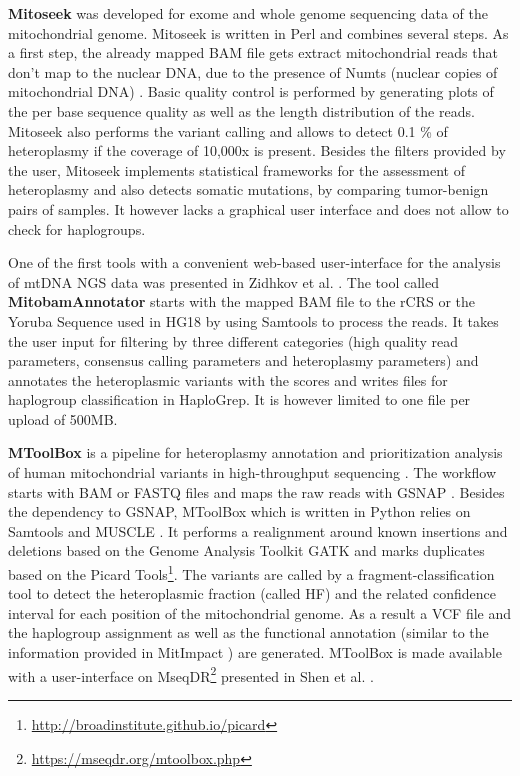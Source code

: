 \textbf{Mitoseek} \cite{Guo2013} was developed for exome and whole genome sequencing data of the mitochondrial genome. Mitoseek is written in Perl and combines several steps. As a first step, the already mapped BAM file gets extract mitochondrial reads that don't map to the nuclear DNA, due to the presence of Numts (nuclear copies of mitochondrial DNA) \cite{Parr2006, Dayama2014}. Basic quality control is performed by generating plots of the per base sequence quality as well as the length distribution of the reads.  Mitoseek also performs the variant calling and allows to detect 0.1 \% of heteroplasmy if the coverage of 10,000x is present. Besides the filters provided by the user, Mitoseek implements statistical frameworks for the assessment of heteroplasmy and also detects somatic mutations, by comparing tumor-benign pairs of samples. It however lacks a graphical user interface and does not allow to check for haplogroups.

One of the first tools with a convenient web-based user-interface for the analysis of mtDNA NGS data was presented in Zidhkov et al. \cite{Zhidkov2011}. The tool called \textbf{MitobamAnnotator} starts with the mapped BAM file to the rCRS or the Yoruba Sequence used in HG18 by using Samtools \cite{Li2009} to process the reads. It takes the user input for filtering by three different categories (high quality read parameters, consensus calling parameters and heteroplasmy parameters) and annotates the heteroplasmic variants with the scores and writes files for haplogroup classification in HaploGrep. It is however limited to one file per upload of 500MB. 

\textbf{MToolBox} is a pipeline for heteroplasmy annotation and prioritization analysis of human mitochondrial variants in high-throughput sequencing \cite{Calabrese2014}. The workflow starts with BAM or FASTQ files and maps the raw reads with GSNAP \cite{Wu2010}. Besides the dependency to GSNAP, MToolBox which is written in Python relies on Samtools and MUSCLE \cite{Edgar2004}. It performs a realignment around known insertions and deletions based on the Genome Analysis Toolkit GATK \cite{McKenna2010} and marks duplicates based on the Picard Tools\footnote{\url{http://broadinstitute.github.io/picard}}. The variants are called by a fragment-classification tool to detect the heteroplasmic fraction (called HF) and the related confidence interval for each position of the mitochondrial genome. As a result a VCF file and the haplogroup assignment as well as the functional annotation (similar to  the information provided in MitImpact \cite{Castellana2014}) are generated. MToolBox is made available with a user-interface on MseqDR\footnote{\url{https://mseqdr.org/mtoolbox.php}} presented in Shen et al. \cite{Shen2015} .  

